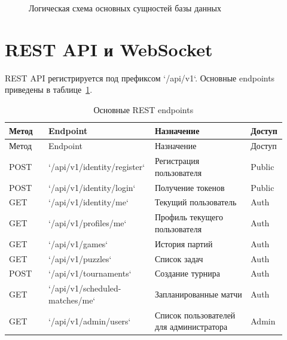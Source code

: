 \documentclass[14pt,a4paper]{extreport}
\begin{document}
\begin{figure}[h]
\centering
{}
\caption{Логическая схема основных сущностей базы данных}\label{fig:erd}
\end{figure}

\section{REST API и WebSocket}

REST API регистрируется под префиксом `/api/v1`. Основные endpoints приведены в таблице~\ref{tab:api}.

\begin{center}
\scriptsize
\setlength{\tabcolsep}{4pt}
\renewcommand{\arraystretch}{1.25}
\begin{longtable}{|>{\RaggedRight\arraybackslash}p{0.14\linewidth}|>{\RaggedRight\arraybackslash}p{0.34\linewidth}|>{\RaggedRight\arraybackslash}p{0.34\linewidth}|>{\RaggedRight\arraybackslash}p{0.10\linewidth}|}
\caption{Основные REST endpoints}\label{tab:api}\\
\hline
Метод & Endpoint & Назначение & Доступ\\ \hline
\endfirsthead
\hline
Метод & Endpoint & Назначение & Доступ\\ \hline
\endhead
POST & `/api/v1/identity/register` & Регистрация пользователя & Public\\ \hline
POST & `/api/v1/identity/login` & Получение токенов & Public\\ \hline
GET & `/api/v1/identity/me` & Текущий пользователь & Auth\\ \hline
GET & `/api/v1/profiles/me` & Профиль текущего пользователя & Auth\\ \hline
GET & `/api/v1/games` & История партий & Auth\\ \hline
GET & `/api/v1/puzzles` & Список задач & Auth\\ \hline
POST & `/api/v1/tournaments` & Создание турнира & Auth\\ \hline
GET & `/api/v1/scheduled-matches/me` & Запланированные матчи & Auth\\ \hline
GET & `/api/v1/admin/users` & Список пользователей для администратора & Admin\\ \hline
\end{longtable}
\end{center}
\end{document}
